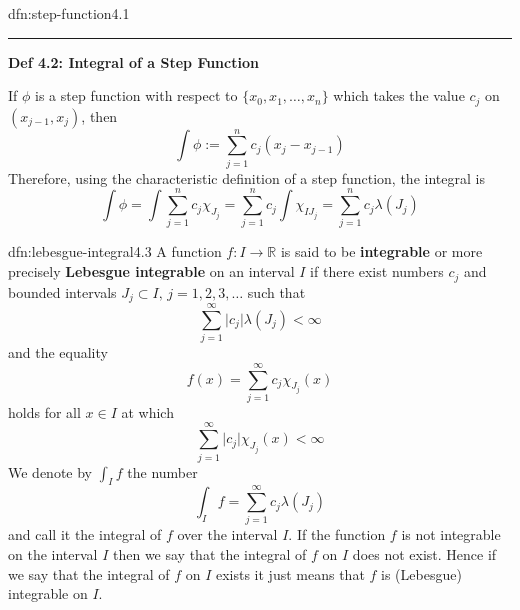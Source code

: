 \documentclass[landscape, 8pt]{extarticle}
\begin{document}
\begin{multicols}{3}
\begin{dfn}{dfn:step-function}{4.1}
	\noindent\rule{\textwidth}{0.2pt}

	\textbf{Def 4.2: Integral of a Step Function}

	If $\phi$ is a step function with respect to $\{x_{0},x_{1},\dots,x_{n}\}$ which takes the value $c_{j}$ on $(x_{j-1},x_{j})$, then
	\[\int \phi := \sum_{j=1}^{n} c_{j}(x_{j}-x_{j-1})\]
	Therefore, using the characteristic definition of a step function, the integral is
	\[\int \phi = \int \sum_{j=1}^{n} c_{j}\chi_{J_{j}}=\sum_{j=1}^{n} c_{j}\int \chi_{IJ_{j}}=\sum_{j=1}^{n} c_{j}\lambda(J_{j})\]
\end{dfn}

\begin{dfn}{dfn:lebesgue-integral}{4.3}
	A function $f:I\to \mathbb{R}$ is said to be \textbf{integrable} or more precisely \textbf{Lebesgue integrable} on an interval $I$ if there exist numbers $c_{j}$ and bounded intervals $J_{j}\subset I,\,j=1,2,3,\dots$ such that
	\[\sum_{j=1}^{\infty} \lvert c_{j} \rvert \lambda(J_{j})<\infty\]
	and the equality
	\[f(x)=\sum_{j=1}^{\infty} c_{j}\chi_{J_{j}}(x)\]
	holds for all $x\in I$ at which
	\[\sum_{j=1}^{\infty} \lvert c_{j} \rvert \chi_{J_{j}}(x)<\infty\]
	We denote by $\int_{I}f$ the number
	\[\int _{I}f=\sum_{j=1}^{\infty} c_{j}\lambda(J_{j})\]
	and call it the integral of $f$ over the interval $I$.
	If the function $f$ is not integrable on the interval $I$ then we say that the integral of $f$ on $I$ does not exist. Hence if we say that the integral of $f$ on $I$ exists it just means that $f$ is (Lebesgue) integrable on $I$.
\end{dfn}




\lipsum[1-12]
\end{multicols}
\end{document}
